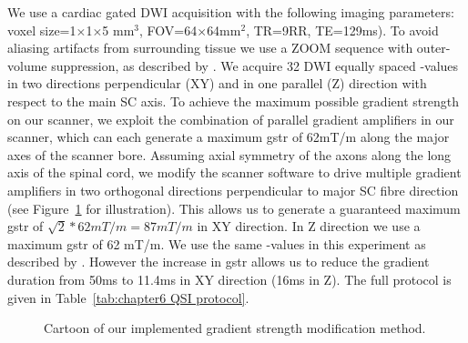 We use a cardiac gated \gls{DWI} acquisition with the following imaging parameters: voxel size=1$\times$1$\times$5 mm$^3$, FOV=64$\times$64mm$^2$, TR=9RR, TE=129ms). To avoid aliasing artifacts from surrounding tissue we use a ZOOM sequence with outer-volume suppression, as described by \citet{Wilm:2007}. We acquire 32 \gls{DWI} equally spaced {\q}-values in two directions perpendicular (XY) and in one parallel (Z) direction with respect to the main {\gls{SC}} axis. To achieve the maximum possible gradient strength on our scanner, we exploit the combination of parallel gradient amplifiers in our scanner, which can each generate a maximum \gls{gstr} of 62mT/m along the major axes of the scanner bore. Assuming axial symmetry of the axons along the long axis of the spinal cord, we modify the scanner software to drive multiple gradient amplifiers in two orthogonal directions perpendicular to major SC fibre direction (see Figure~\ref{fig:chapter5_exp2_overplus_cartoon} for illustration). This allows us to generate a guaranteed maximum \gls{gstr} of $\sqrt{2} * 62mT/m = 87mT/m$ in XY direction.  In Z direction we use a maximum \gls{gstr} of 62 mT/m. We use the same {\q}-values in this experiment as described by \citet{Farrell:2008}. However the increase in \gls{gstr} allows us to reduce the gradient duration from 50ms to 11.4ms in XY direction (16ms in Z). The full protocol is given in Table~\ref{tab:chapter6 QSI protocol}.

\begin{figure}[htb]
  \caption{Cartoon of our implemented gradient strength modification method.}
  \label{fig:chapter5_exp2_overplus_cartoon}
\end{figure}

